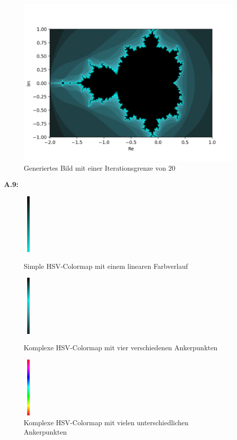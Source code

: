 \begin{figure}[H]
\begin{minipage}[t]{0.48\textwidth}
  \label{app:8.6}
\end{minipage}
\begin{minipage}[t]{\textwidth}
  \centering
  \includegraphics[width=0.48\linewidth]{images/maxBorder/20}
  \vspace*{-4ex}
  \caption{Generiertes Bild mit einer Iterationsgrenze von $20$}
  \label{app:8.7}
\end{minipage}
\label{fig:mandelbrot-set-max-border-2}
\end{figure}

\noindent\textbf{A.9:}\label{app:9}
\begin{figure}[H]
\centering
\begin{minipage}[t]{0.30\textwidth}
  \centering
  \includegraphics[width=0.5cm, height=3cm]{images/simple_color_map}
  \caption{Simple HSV-Colormap mit einem linearen Farbverlauf}
  \label{app:9.1}
\end{minipage}%
\hfill
\begin{minipage}[t]{0.30\textwidth}
 \centering
 \includegraphics[width=0.5cm, height=3cm]{images/used_color_map}
 \caption{Komplexe HSV-Colormap mit vier verschiedenen Ankerpunkten}
 \label{app:9-2}
\end{minipage}%
\hfill
\begin{minipage}[t]{0.30\textwidth}
 \centering
 \includegraphics[width=0.5cm, height=3cm]{images/complex_color_map}
 \caption{Komplexe HSV-Colormap mit vielen unterschiedlichen Ankerpunkten}
 \label{app:9.3}
\end{minipage}
\label{fig:color-maps}
\end{figure}

